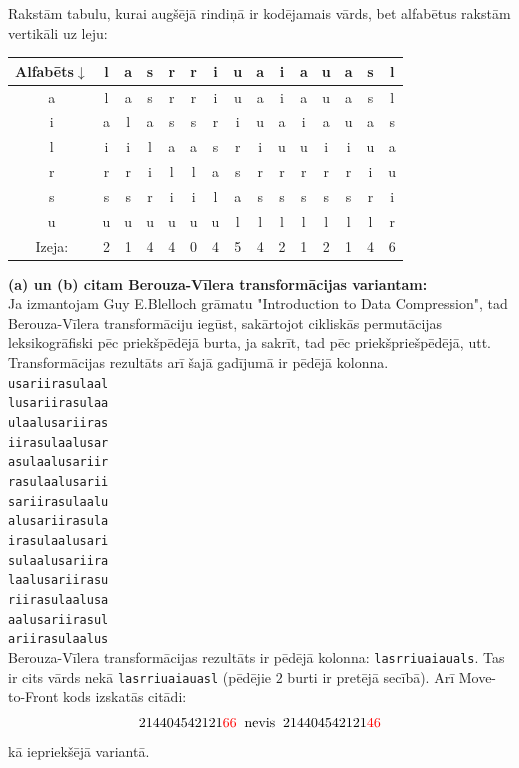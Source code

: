\documentclass[a4paper,12pt]{article}
\begin{document}
{\noindent
Rakstām tabulu, kurai augšējā rindiņā ir kodējamais vārds, bet
alfabētus rakstām vertikāli uz leju:\\
\begin{tabular}{c|cccccccccccccc}
Alfabēts$\downarrow$ & l & a & s & r & r & i & u & a & i & a & u & a & s & l \\ \hline
a                    & l & a & s & r & r & i & u & a & i & a & u & a & s & l \\ 
i                    & a & l & a & s & s & r & i & u & a & i & a & u & a & s \\ 
l                    & i & i & l & a & a & s & r & i & u & u & i & i & u & a \\ 
r                    & r & r & i & l & l & a & s & r & r & r & r & r & i & u \\ 
s                    & s & s & r & i & i & l & a & s & s & s & s & s & r & i \\ 
u                    & u & u & u & u & u & u & l & l & l & l & l & l & l & r \\ \hline
Izeja:               & 2 & 1 & 4 & 4 & 0 & 4 & 5 & 4 & 2 & 1 & 2 & 1 & 4 & 6 
\end{tabular}


\noindent
{\bf (a) un (b) citam Berouza-Vīlera transformācijas variantam:}\\
Ja izmantojam Guy E.Blelloch grāmatu "Introduction to Data Compression", tad
Berouza-Vīlera transformāciju iegūst, sakārtojot cikliskās permutācijas
leksikogrāfiski pēc priekšpēdējā burta, ja sakrīt, tad pēc priekšpriešpēdējā, utt. 
Transformācijas rezultāts arī šajā gadījumā ir pēdējā kolonna.\\[10pt]

{\tt usariirasulaal}\\
{\tt lusariirasulaa}\\
{\tt ulaalusariiras}\\
{\tt iirasulaalusar}\\
{\tt asulaalusariir}\\
{\tt rasulaalusarii}\\
{\tt sariirasulaalu}\\
{\tt alusariirasula}\\
{\tt irasulaalusari}\\
{\tt sulaalusariira}\\
{\tt laalusariirasu}\\
{\tt riirasulaalusa}\\
{\tt aalusariirasul}\\
{\tt ariirasulaalus}\\


Berouza-Vīlera transformācijas rezultāts ir pēdējā kolonna: {\tt lasrriuaiauals}. 
Tas ir cits vārds nekā {\tt lasrriuaiauasl} (pēdējie $2$ burti ir pretējā secībā). 
Arī Move-to-Front kods izskatās citādi: 
$$214404542121\textcolor{red}{66}\;\;\text{nevis}\;\;214404542121\textcolor{red}{46}$$
kā iepriekšējā variantā.

}
\end{document}
